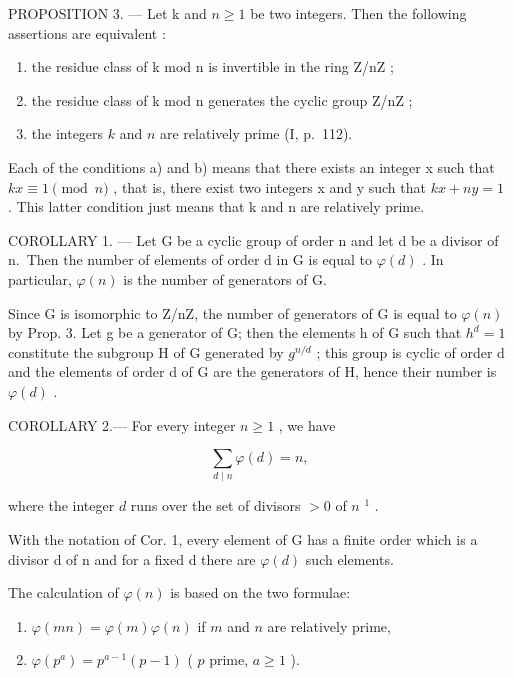 PROPOSITION 3. --- Let k and \(n \geqslant 1\) be two integers. Then the following assertions are equivalent :

\begin{enumerate}
\def\labelenumi{\alph{enumi})}
\item
  the residue class of k mod n is invertible in the ring Z/nZ ;
\item
  the residue class of k mod n generates the cyclic group Z/nZ ;
\item
  the integers \(k\) and \(n\) are relatively prime (I, p.~112).
\end{enumerate}

Each of the conditions a) and b) means that there exists an integer x such that \(kx \equiv 1 \pmod{n}\) , that is, there exist two integers x and y such that \(kx + ny = 1\) . This latter condition just means that k and n are relatively prime.

COROLLARY 1. --- Let G be a cyclic group of order n and let d be a divisor of n.~Then the number of elements of order d in G is equal to \(\varphi(d)\) . In particular, \(\varphi(n)\) is the number of generators of G.

Since G is isomorphic to Z/nZ, the number of generators of G is equal to \(\varphi(n)\) by Prop. 3. Let g be a generator of G; then the elements h of G such that \(h^{d}=1\) constitute the subgroup H of G generated by \(g^{n/d}\) ; this group is cyclic of order d and the elements of order d of G are the generators of H, hence their number is \(\varphi(d)\) .

COROLLARY 2.--- For every integer \(n \geqslant 1\) , we have

\[
\sum_ {d \mid n} \varphi (d) = n,\tag{1}
\]

where the integer \(d\) runs over the set of divisors \(>0\) of \(n\) \(^{1}\) .

With the notation of Cor. 1, every element of G has a finite order which is a divisor d of n and for a fixed d there are \(\varphi(d)\) such elements.

The calculation of \(\varphi(n)\) is based on the two formulae:

\begin{enumerate}
\def\labelenumi{(\arabic{enumi})}
\setcounter{enumi}{1}
\item
  \(\varphi(mn) = \varphi(m)\varphi(n)\) if \(m\) and \(n\) are relatively prime,
\item
  \(\varphi(p^a) = p^{a-1}(p - 1)\) ( \(p\) prime, \(a \geqslant 1\) ).
\end{enumerate}

